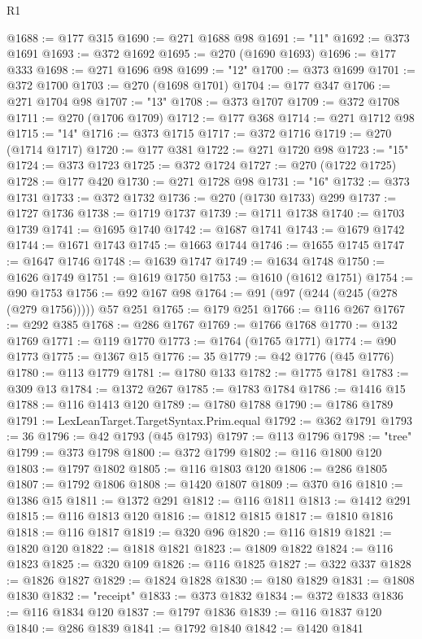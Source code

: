 \begin{lexlean}{R1}
\begin{coremodule}
@1688 := @177 @315
@1690 := @271 @1688 @98
@1691 := "11"
@1692 := @373 @1691
@1693 := @372 @1692
@1695 := @270 (@1690 @1693)
@1696 := @177 @333
@1698 := @271 @1696 @98
@1699 := "12"
@1700 := @373 @1699
@1701 := @372 @1700
@1703 := @270 (@1698 @1701)
@1704 := @177 @347
@1706 := @271 @1704 @98
@1707 := "13"
@1708 := @373 @1707
@1709 := @372 @1708
@1711 := @270 (@1706 @1709)
@1712 := @177 @368
@1714 := @271 @1712 @98
@1715 := "14"
@1716 := @373 @1715
@1717 := @372 @1716
@1719 := @270 (@1714 @1717)
@1720 := @177 @381
@1722 := @271 @1720 @98
@1723 := "15"
@1724 := @373 @1723
@1725 := @372 @1724
@1727 := @270 (@1722 @1725)
@1728 := @177 @420
@1730 := @271 @1728 @98
@1731 := "16"
@1732 := @373 @1731
@1733 := @372 @1732
@1736 := @270 (@1730 @1733) @299
@1737 := @1727 @1736
@1738 := @1719 @1737
@1739 := @1711 @1738
@1740 := @1703 @1739
@1741 := @1695 @1740
@1742 := @1687 @1741
@1743 := @1679 @1742
@1744 := @1671 @1743
@1745 := @1663 @1744
@1746 := @1655 @1745
@1747 := @1647 @1746
@1748 := @1639 @1747
@1749 := @1634 @1748
@1750 := @1626 @1749
@1751 := @1619 @1750
@1753 := @1610 (@1612 @1751)
@1754 := @90 @1753
@1756 := @92 @167 @98
@1764 := @91 (@97 (@244 (@245 (@278 (@279 @1756))))) @57 @251
@1765 := @179 @251
@1766 := @116 @267
@1767 := @292 @385
@1768 := @286 @1767
@1769 := @1766 @1768
@1770 := @132 @1769
@1771 := @119 @1770
@1773 := @1764 (@1765 @1771)
@1774 := @90 @1773
@1775 := @1367 @15
@1776 := 35
@1779 := @42 @1776 (@45 @1776)
@1780 := @113 @1779
@1781 := @1780 @133
@1782 := @1775 @1781
@1783 := @309 @13
@1784 := @1372 @267
@1785 := @1783 @1784
@1786 := @1416 @15
@1788 := @116 @1413 @120
@1789 := @1780 @1788
@1790 := @1786 @1789
@1791 := LexLeanTarget.TargetSyntax.Prim.equal
@1792 := @362 @1791
@1793 := 36
@1796 := @42 @1793 (@45 @1793)
@1797 := @113 @1796
@1798 := "tree"
@1799 := @373 @1798
@1800 := @372 @1799
@1802 := @116 @1800 @120
@1803 := @1797 @1802
@1805 := @116 @1803 @120
@1806 := @286 @1805
@1807 := @1792 @1806
@1808 := @1420 @1807
@1809 := @370 @16
@1810 := @1386 @15
@1811 := @1372 @291
@1812 := @116 @1811
@1813 := @1412 @291
@1815 := @116 @1813 @120
@1816 := @1812 @1815
@1817 := @1810 @1816
@1818 := @116 @1817
@1819 := @320 @96
@1820 := @116 @1819
@1821 := @1820 @120
@1822 := @1818 @1821
@1823 := @1809 @1822
@1824 := @116 @1823
@1825 := @320 @109
@1826 := @116 @1825
@1827 := @322 @337
@1828 := @1826 @1827
@1829 := @1824 @1828
@1830 := @180 @1829
@1831 := @1808 @1830
@1832 := "receipt"
@1833 := @373 @1832
@1834 := @372 @1833
@1836 := @116 @1834 @120
@1837 := @1797 @1836
@1839 := @116 @1837 @120
@1840 := @286 @1839
@1841 := @1792 @1840
@1842 := @1420 @1841

\end{coremodule}
\end{lexlean}
